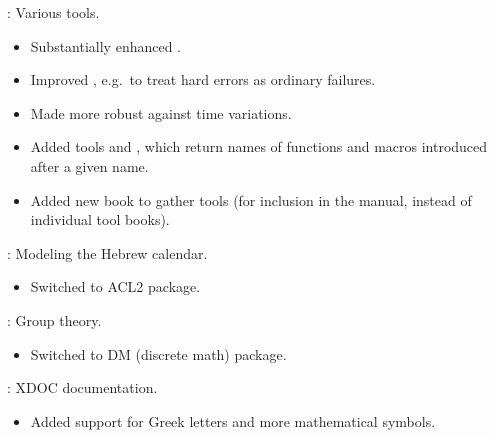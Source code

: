 
\begin{frame}

\implibtitle

:
Various tools.
\begin{itemize}
\item Substantially enhanced .
\item Improved , e.g.\ to treat hard errors as ordinary failures.
\item Made  more robust against time variations.
\item Added tools  and ,
  which return names of functions and macros introduced after a given name.
\item Added new  book to gather tools (for inclusion in the
  manual, instead of individual tool books).
\end{itemize}

\end{frame}


\begin{frame}

\implibtitle

:
Modeling the Hebrew calendar.
\begin{itemize}
\item Switched to ACL2 package.
\end{itemize}

:
Group theory.
\begin{itemize}
\item Switched to DM (discrete math) package.
\end{itemize}

\end{frame}


\begin{frame}

\implibtitle

:
XDOC documentation.
\begin{itemize}
\item Added support for Greek letters and more mathematical symbols.
\end{itemize}

\end{frame}



